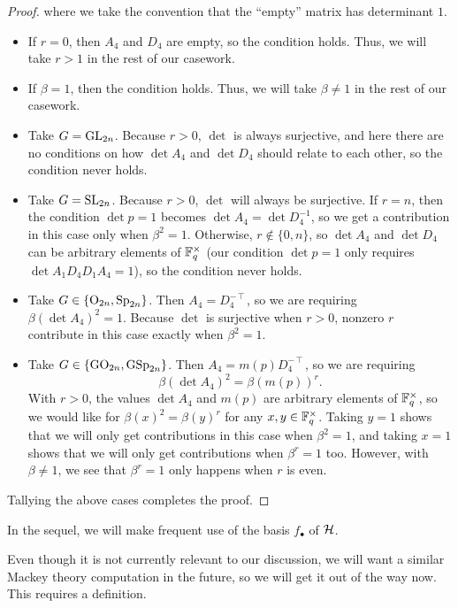 \begin{proof}
    where we take the convention that the ``empty'' matrix has determinant $1$. %
    \begin{itemize}
        \item If $r=0$, then $A_4$ and $D_4$ are empty, so the condition holds. Thus, we will take $r>1$ in the rest of our casework.
        \item If $\beta=1$, then the condition holds. Thus, we will take $\beta\ne1$ in the rest of our casework.
        \item Take $G=\mathrm{GL}_{2n}$. Because $r>0$, $\det$ is always surjective, and here there are no conditions on how $\det A_4$ and $\det D_4$ should relate to each other, so the condition never holds.
        \item Take $G=\mathrm{SL}_{2n}$. Because $r>0$, $\det$ will always be surjective. If $r=n$, then the condition $\det p=1$ becomes $\det A_4=\det D_4^{-1}$, so we get a contribution in this case only when $\beta^2=1$. Otherwise, $r\notin\{0,n\}$, so $\det A_4$ and $\det D_4$ can be arbitrary elements of $\mathbb F_q^\times$ (our condition $\det p=1$ only requires $\det A_1D_4D_1A_4=1$), so the condition never holds.
        \item Take $G\in\{\mathrm{O}_{2n},\mathrm{Sp}_{2n}\}$. Then $A_4=D_4^{-\intercal}$, so we are requiring $\beta(\det A_4)^2=1$. Because $\det$ is surjective when $r>0$, nonzero $r$ contribute in this case exactly when $\beta^2=1$.
        \item Take $G\in\{\mathrm{GO}_{2n},\mathrm{GSp}_{2n}\}$. Then $A_4=m(p)D_4^{-\intercal}$, so we are requiring
        \[\beta(\det A_4)^2=\beta(m(p))^r.\]
        With $r>0$, the values $\det A_4$ and $m(p)$ are arbitrary elements of $\mathbb F_q^\times$, so we would like for $\beta(x)^2=\beta(y)^r$ for any $x,y\in\mathbb F_q^\times$. Taking $y=1$ shows that we will only get contributions in this case when $\beta^2=1$, and taking $x=1$ shows that we will only get contributions when $\beta^r=1$ too. However, with $\beta\ne1$, we see that $\beta^r=1$ only happens when $r$ is even.
    \end{itemize}
    Tallying the above cases completes the proof.
\end{proof}
\begin{remark}
    In the sequel, we will make frequent use of the basis $f_\bullet$ of $\mathcal{H}$.
\end{remark}
Even though it is not currently relevant to our discussion, we will want a similar Mackey theory computation in the future, so we will get it out of the way now. This requires a definition.
